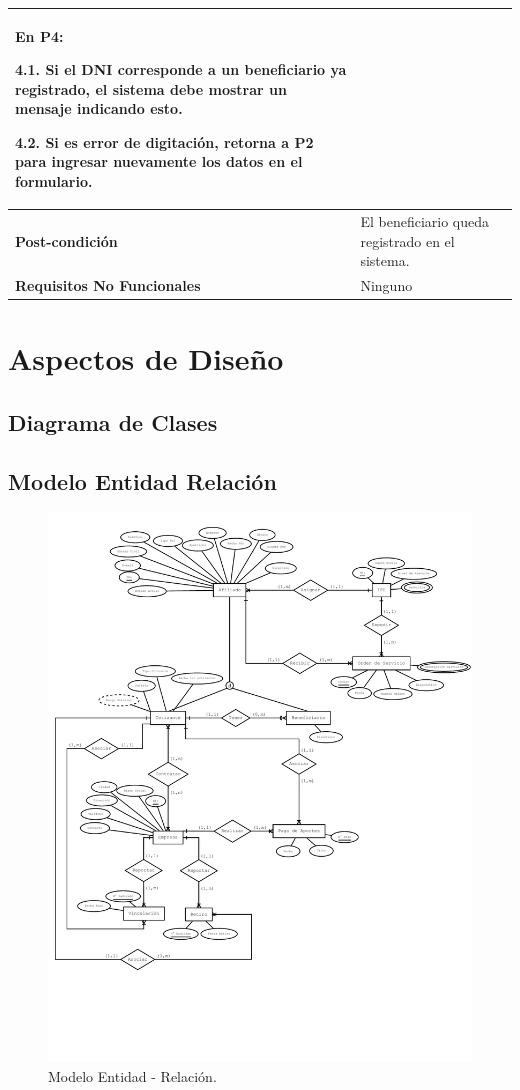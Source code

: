 \documentclass[12pt,a4paper]{article}
\begin{document}
\begin{center}
\begin{tabular}{|m{5.5cm}| m{9.5cm}|}
	En P4:
	
	4.1. Si el DNI corresponde a un beneficiario ya registrado, el sistema debe mostrar un mensaje indicando esto.
	
	4.2. Si es error de digitación, retorna a P2 para ingresar nuevamente los datos en el formulario. \\ 
\hline 
\textbf{Post-condición}  & El beneficiario queda registrado en el sistema. \\ 
\hline 
\textbf{Requisitos No Funcionales} & Ninguno \\ 
\hline 
\end{tabular}
\vspace{5mm}
\end{center}
\section{Aspectos de Diseño}
\subsection{Diagrama de Clases}

\subsection{Modelo Entidad Relación}
\begin{figure}[H]
\centering
{\includegraphics[width=1\textwidth]{Entity_relationship_diagram.pdf} \par}
\caption{Modelo Entidad - Relación.}
\end{figure}
\end{document}
